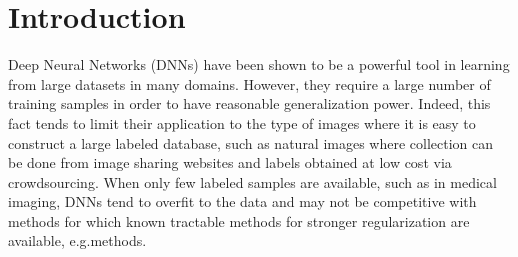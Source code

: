 \documentclass{article}
\newcommand{\todo}[1]{\textcolor{red}{\textbf{Fix:} \emph{#1}}}
\begin{document}
\section{Introduction}

Deep Neural Networks (DNNs) have been shown to be a powerful tool in learning from large datasets in many domains. However, they require a large number of training samples in order to have reasonable generalization power. Indeed, this fact tends to limit their application to the type of images where it is easy to construct a large labeled database, such as natural images where collection can be done from image sharing websites and labels obtained at low cost via crowdsourcing. When only few labeled samples are available, such as in medical imaging, DNNs tend to overfit to the data and may not be competitive with methods for which known tractable methods for stronger regularization are available, e.g. methods.

\end{document}
